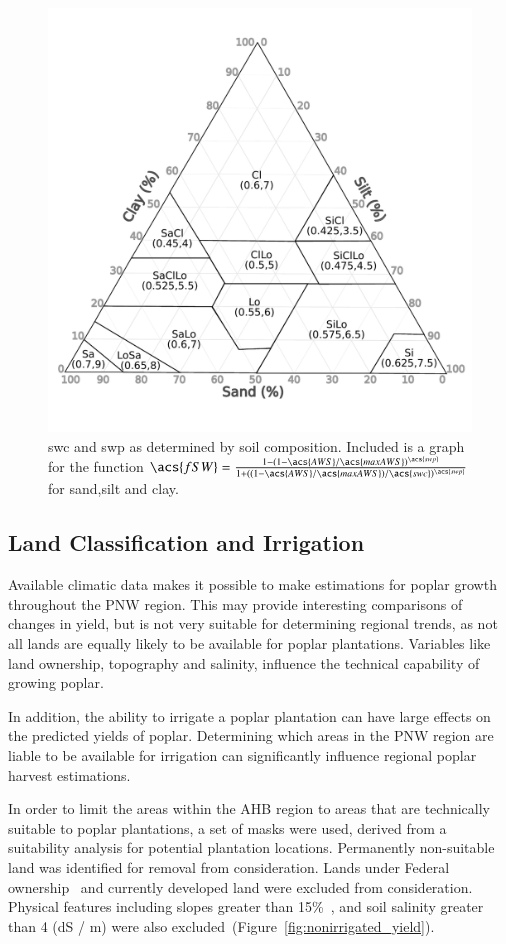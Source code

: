 \documentclass[preprint,12pt]{elsarticle}
\begin{document}
\begin{figure}
  \centering
  \includegraphics[width=0.45\linewidth]{soil_triangle}
  
  \caption{\acs{swc} and \acs{swp} as determined by soil composition.  Included is a graph for the function $\acs{fSW} = \frac{1-(1-\acs{AWS}/\acs{maxAWS})^{\acs{swp}}}{1+((1-\acs{AWS}/\acs{maxAWS})/\acs{swc})^{\acs{swp}}}$ for sand,silt and clay. }
  \label{fig:soil-triangle}
\end{figure}

\subsection{Land Classification and Irrigation}
\label{sec:land}

Available climatic data makes it possible to make estimations for
poplar growth throughout the \ac{PNW} region.  This may provide
interesting comparisons of changes in yield, but is not very suitable
for determining regional trends, as not all lands are equally likely
to be available for poplar plantations.  Variables like land
ownership, topography and salinity, influence the technical capability
of growing poplar.  

In addition, the ability to irrigate a poplar plantation can have
large effects on the predicted yields of poplar.  Determining which
areas in the \ac{PNW} region are liable to be available for irrigation
can significantly influence regional poplar harvest estimations.  

In order to limit the areas within the \ac{AHB} region to areas that
are technically suitable to poplar plantations, a set of masks were
used, derived from a suitability analysis for potential plantation
locations. Permanently non-suitable land was
identified for removal from consideration. Lands under Federal
ownership~\cite{NationalAtlasoftheUnitedStates2013} and currently
developed land were excluded from consideration.
Physical features including slopes greater than 15\%~\cite{Gesch2007},
and soil salinity greater than 4 (dS / m) were also
excluded~(Figure~\ref{fig:nonirrigated_yield}).
\end{document}
